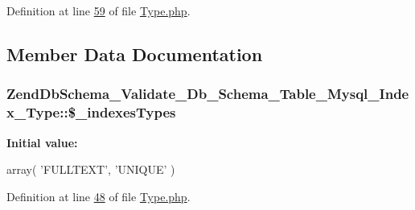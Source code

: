 \-Definition at line \hyperlink{Index_2Type_8php_source_l00059}{59} of file \hyperlink{Index_2Type_8php_source}{\-Type.\-php}.



\subsection{\-Member \-Data \-Documentation}
\hypertarget{classZendDbSchema__Validate__Db__Schema__Table__Mysql__Index__Type_a14e7a0b54e19accfd964539d11559ea6}{
\subsubsection[{\$\-\_\-indexes\-Types}]{\setlength{\rightskip}{0pt plus 5cm}\-Zend\-Db\-Schema\-\_\-\-Validate\-\_\-\-Db\-\_\-\-Schema\-\_\-\-Table\-\_\-\-Mysql\-\_\-\-Index\-\_\-\-Type\-::\$\-\_\-indexes\-Types}}\label{classZendDbSchema__Validate__Db__Schema__Table__Mysql__Index__Type_a14e7a0b54e19accfd964539d11559ea6}
{\bfseries \-Initial value\-:}
\begin{DoxyCode}
 array(
        \textcolor{stringliteral}{'FULLTEXT'},
        \textcolor{stringliteral}{'UNIQUE'}
    )
\end{DoxyCode}


\-Definition at line \hyperlink{Index_2Type_8php_source_l00048}{48} of file \hyperlink{Index_2Type_8php_source}{\-Type.\-php}.

